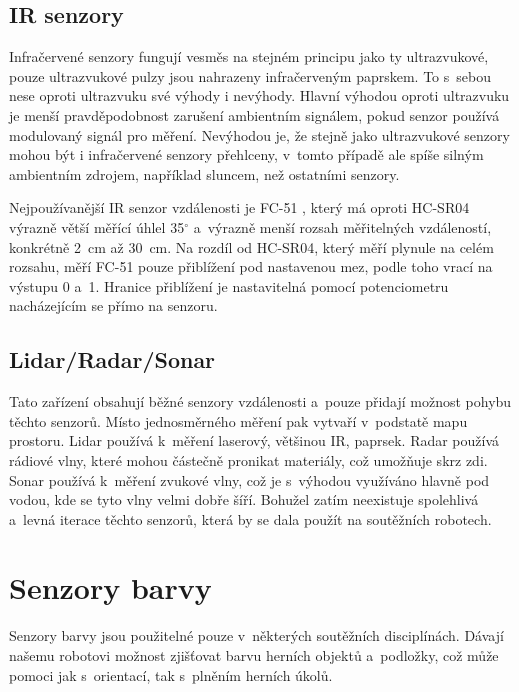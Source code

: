 \subsection{IR senzory}
Infračervené senzory fungují vesměs na stejném principu jako ty ultrazvukové, pouze ultrazvukové pulzy jsou nahrazeny infračerveným paprskem.
To s~sebou nese oproti ultrazvuku své výhody i nevýhody.
Hlavní výhodou oproti ultrazvuku je menší pravděpodobnost zarušení ambientním signálem, pokud senzor používá modulovaný signál pro měření. 
Nevýhodou je, že stejně jako ultrazvukové senzory mohou být i infračervené senzory přehlceny, v~tomto případě ale spíše silným ambientním zdrojem, například sluncem, než ostat\-ní\-mi senzory.

Nejpoužívanější IR senzor vzdálenosti je FC-51 \cite{fc-51}, který má oproti HC-SR04 výrazně větší měřící úhlel 35$^{\circ}$ a~výrazně menší rozsah měřitelných vzdáleností, konkrétně 2~cm až 30~cm.
Na rozdíl od HC-SR04, který měří plynule na celém rozsahu, měří FC-51 pouze přiblížení pod nastavenou mez, podle toho vrací na výstupu 0 a~1.
Hranice přiblížení je nastavitelná pomocí potenciometru nacházejícím se přímo na senzoru.


\subsection{Lidar/Radar/Sonar}
Tato zařízení obsahují běžné senzory vzdálenosti a~pouze přidají možnost pohybu těchto senzorů. 
Místo jednosměrného měření pak vytvaří v~podstatě mapu prostoru.
Lidar používá k~měření laserový, většinou IR, paprsek.
Radar používá rádiové vlny, které mohou částečně pronikat materiály, což umožňuje  skrz zdi.
Sonar používá k~měření zvukové vlny, což je s~výhodou využíváno hlavně pod vodou, kde se tyto vlny velmi dobře šíří.
Bohužel zatím neexistuje spolehlivá a~levná iterace těchto senzorů, která by se dala použít na soutěžních robotech.

\section{Senzory barvy}
Senzory barvy jsou použitelné pouze v~některých soutěžních disciplínách.
Dávají našemu robotovi možnost zjišťovat barvu herních objektů a~podložky, což může pomoci jak s~orientací, tak s~plněním herních úkolů.

